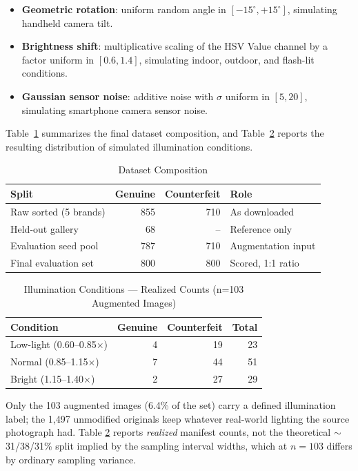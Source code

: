 \documentclass[conference]{IEEEtran}
\begin{document}
\begin{itemize}
    \item \textbf{Geometric rotation}: uniform random angle in $[-15^\circ, +15^\circ]$, simulating handheld camera tilt.
    \item \textbf{Brightness shift}: multiplicative scaling of the HSV Value channel by a factor uniform in $[0.6, 1.4]$, simulating indoor, outdoor, and flash-lit conditions.
    \item \textbf{Gaussian sensor noise}: additive noise with $\sigma$ uniform in $[5, 20]$, simulating smartphone camera sensor noise.
\end{itemize}

Table~\ref{tab:dataset} summarizes the final dataset composition, and
Table~\ref{tab:illumination} reports the resulting distribution of
simulated illumination conditions.

\begin{table}[t]
\caption{Dataset Composition}
\label{tab:dataset}
\centering
\begin{tabular}{lrrl}
\toprule
Split & Genuine & Counterfeit & Role \\
\midrule
Raw sorted (5 brands) & 855 & 710 & As downloaded \\
Held-out gallery       & 68  & --  & Reference only \\
Evaluation seed pool   & 787 & 710 & Augmentation input \\
Final evaluation set   & 800 & 800 & Scored, 1:1 ratio \\
\bottomrule
\end{tabular}
\end{table}

\begin{table}[t]
\caption{Illumination Conditions --- Realized Counts (n=103 Augmented Images)}
\label{tab:illumination}
\centering
\begin{tabular}{lrrr}
\toprule
Condition & Genuine & Counterfeit & Total \\
\midrule
Low-light (0.60--0.85$\times$) & 4  & 19 & 23 \\
Normal (0.85--1.15$\times$)     & 7  & 44 & 51 \\
Bright (1.15--1.40$\times$)     & 2  & 27 & 29 \\
\bottomrule
\end{tabular}
\end{table}

Only the 103 augmented images (6.4\% of the set) carry a defined
illumination label; the 1{,}497 unmodified originals keep whatever
real-world lighting the source photograph had. Table
\ref{tab:illumination} reports \emph{realized} manifest counts, not the
theoretical $\sim$31/38/31\% split implied by the sampling interval
widths, which at $n=103$ differs by ordinary sampling variance.
\end{document}
